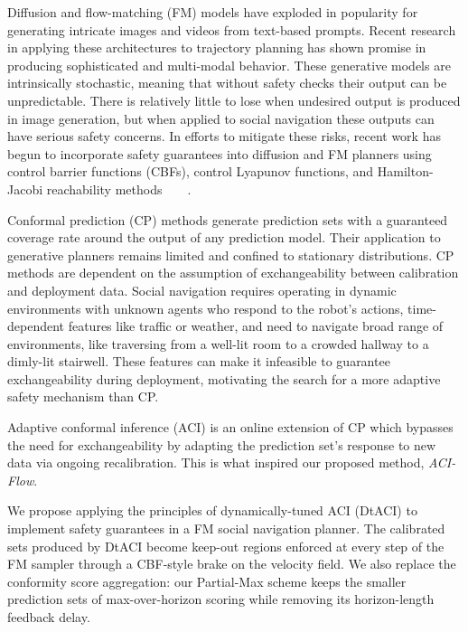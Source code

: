 \documentclass[letterpaper]{article} %
\begin{document}
Diffusion and flow-matching (FM) models have exploded in popularity for generating intricate images and videos from text-based prompts. Recent research in applying these architectures to trajectory planning has shown promise in producing sophisticated and multi-modal behavior. These generative models are intrinsically stochastic, meaning that without safety checks their output can be unpredictable. There is relatively little to lose when undesired output is produced in image generation, but when applied to social navigation these outputs can have serious safety concerns. In efforts to mitigate these risks, recent work has begun to incorporate safety guarantees into diffusion and FM planners using control barrier functions (CBFs), control Lyapunov functions, and Hamilton-Jacobi reachability methods~\cite{mizuta_cobl-diffusion_2024}~\cite{yang_safeflowmatcher_2025}~\cite{xiao_safediffuser_2023}~\cite{dai_safeflow_2025}. 


Conformal prediction (CP) methods generate prediction sets with a guaranteed coverage rate around the output of any prediction model. Their application to generative planners remains limited and confined to stationary distributions. CP methods are dependent on the assumption of exchangeability between calibration and deployment data. Social navigation requires operating in dynamic environments with unknown agents who respond to the robot's actions, time-dependent features like traffic or weather, and need to navigate broad range of environments, like traversing from a well-lit room to a crowded hallway to a dimly-lit stairwell. These features can make it infeasible to guarantee exchangeability during deployment, motivating the search for a more adaptive safety mechanism than CP. 

Adaptive conformal inference (ACI) is an online extension of CP which bypasses the need for exchangeability by adapting the prediction set's response to new data via ongoing recalibration. This is what inspired our proposed method, \textit{ACI-Flow}.

We propose applying the principles of dynamically-tuned ACI (DtACI) to implement safety guarantees in a FM social navigation planner. The calibrated sets produced by DtACI become keep-out regions enforced at every step of the FM sampler through a CBF-style brake on the velocity field. We also replace the conformity score aggregation: our Partial-Max scheme keeps the smaller prediction sets of max-over-horizon scoring while removing its horizon-length feedback delay.
\end{document}
